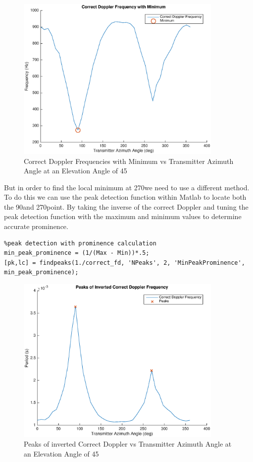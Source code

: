 \begin{figure}
	\begin{center}
		\includegraphics[width=10cm]{images/results/Correct_doppler_with_Minumum.eps}
		\caption{Correct Doppler Frequencies with Minimum vs Transmitter Azimuth Angle at an Elevation Angle of 45\textdegree}
		\label{fig:min_correct_fd}
	\end{center}
\end{figure}

But in order to find the local minimum at 270\textdegree \space we need to use a different method. To do this we can use the peak detection function within Matlab to locate both the 90\textdegree and 270\textdegree point. By taking the inverse of the correct Doppler and tuning the peak detection function with the maximum and minimum values to determine accurate prominence.

\begin{lstlisting}
%peak detection with prominence calculation
min_peak_prominence = (1/(Max - Min))*.5;
[pk,lc] = findpeaks(1./correct_fd, 'NPeaks', 2, 'MinPeakProminence', min_peak_prominence);
\end{lstlisting}

\begin{figure}
	\begin{center}
		\includegraphics[width=10cm]{images/results/Correct_doppler_inverse_peaks.eps}
		\caption{Peaks of inverted Correct Doppler vs Transmitter Azimuth Angle at an Elevation Angle of 45\textdegree}
		\label{fig:peaks}
	\end{center}
\end{figure}

